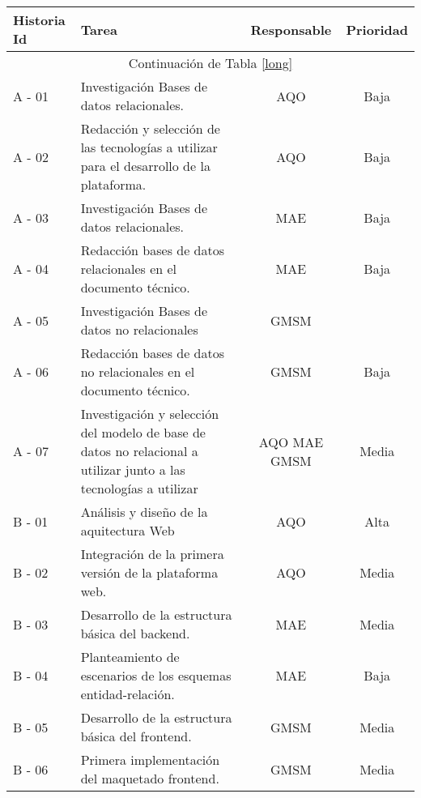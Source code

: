 \begin{longtable}{ p{1.3cm} | p{7.6cm} | c | c }	
	
	\hline
	\centering \textbf{Historia Id} & \centering  \textbf{Tarea } & \centering  \textbf{Responsable } & \textbf{Prioridad } \\
	\hline
	\hline
	
	\endfirsthead
	
	\multicolumn{4}{c}{Continuación de Tabla \ref{long}}\\
	\hline
	\hline
	\endhead
	
	\hline
	\endfoot
	
	\centering A - 01 & Investigación Bases de datos relacionales.& AQO & Baja\\[.5cm]
	\hline
	\centering A - 02 & Redacción y selección de las tecnologías a utilizar para el desarrollo de la plataforma. & AQO & Baja \\[.5cm]
	\hline
	\centering A - 03 & Investigación Bases de datos relacionales. & MAE & Baja \\[.5cm]
	\hline
	\centering A -  04 & Redacción bases de datos relacionales	en el documento técnico. & MAE & Baja \\[.5cm]
	\hline
	\centering A - 05 & Investigación Bases de datos no relacionales & GMSM &  \\[.5cm]
	\hline
	\centering A - 06 & Redacción bases de datos no relacionales en el documento técnico. & GMSM & Baja \\[.5cm]
	\hline
	\centering A - 07 & Investigación y selección del modelo de base de datos no relacional a utilizar junto a las	tecnologías a utilizar & AQO MAE GMSM & Media \\[.5cm]
	\hline
	\centering B - 01 & Análisis y diseño de la aquitectura Web & AQO & Alta \\[.5cm]
	\hline
	\centering B - 02  & Integración de la primera versión de la plataforma web. & AQO & Media \\[.5cm]
	\hline
	\centering B - 03 & Desarrollo de la estructura básica del backend. & MAE & Media \\[.5cm]
	\hline
	\centering B - 04 & Planteamiento de escenarios de los esquemas entidad-relación. & MAE & Baja \\[.5cm]
	\hline
	\centering B - 05 & Desarrollo de la estructura	básica del frontend. & GMSM & Media \\[.5cm]
	\hline
	\centering B - 06 & Primera implementación del maquetado frontend. & GMSM & Media \\[.5cm]
	\hline

\end{longtable}
